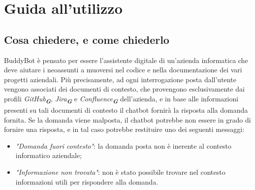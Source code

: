 
\section{Guida all’utilizzo}
\label{sec:guida_utilizzo}


\subsection{Cosa chiedere, e come chiederlo}
BuddyBot è pensato per essere l'assistente digitale di un'azienda informatica che deve aiutare i neoassunti a muoversi nel codice
e nella documentazione dei vari progetti aziendali. Più precisamente, ad ogni interrogazione posta dall'utente vengono associati dei
documenti di contesto, che provengono esclusivamente dai profili \emph{GitHub}\textsubscript{\textbf{\textit{G}}},
\emph{Jira}\textsubscript{\textbf{\textit{G}}} e \emph{Confluence}\textsubscript{\textbf{\textit{G}}} dell'azienda, e in base alle
informazioni presenti su tali documenti di contesto il chatbot fornirà la risposta alla domanda fornita.
Se la domanda viene malposta, il chatbot potrebbe non essere in grado di fornire una risposta, e in tal caso potrebbe restituire
uno dei seguenti messaggi:
\begin{itemize}
    \item \emph{"Domanda fuori contesto"}: la domanda posta non è inerente al contesto informatico aziendale;
    \item \emph{"Informazione non trovata"}: non è stato possibile trovare nel contesto informazioni utili per rispondere alla domanda.
\end{itemize}

